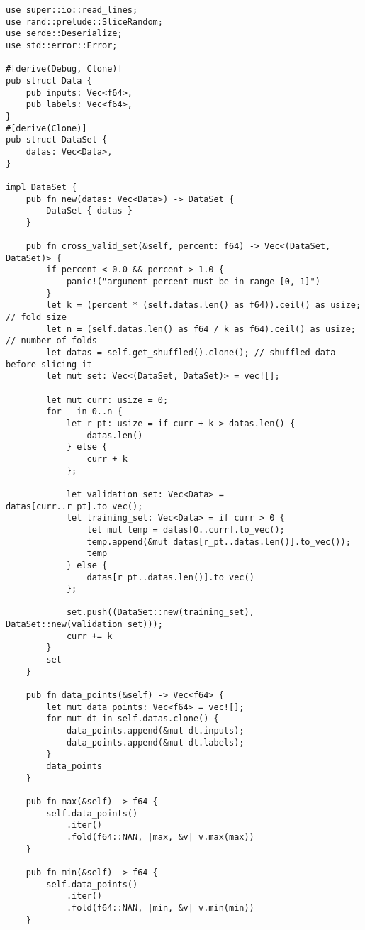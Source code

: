 \begin{verbatim}        
use super::io::read_lines;
use rand::prelude::SliceRandom;
use serde::Deserialize;
use std::error::Error;

#[derive(Debug, Clone)]
pub struct Data {
    pub inputs: Vec<f64>,
    pub labels: Vec<f64>,
}
#[derive(Clone)]
pub struct DataSet {
    datas: Vec<Data>,
}

impl DataSet {
    pub fn new(datas: Vec<Data>) -> DataSet {
        DataSet { datas }
    }

    pub fn cross_valid_set(&self, percent: f64) -> Vec<(DataSet, DataSet)> {
        if percent < 0.0 && percent > 1.0 {
            panic!("argument percent must be in range [0, 1]")
        }
        let k = (percent * (self.datas.len() as f64)).ceil() as usize; // fold size
        let n = (self.datas.len() as f64 / k as f64).ceil() as usize; // number of folds
        let datas = self.get_shuffled().clone(); // shuffled data before slicing it
        let mut set: Vec<(DataSet, DataSet)> = vec![];

        let mut curr: usize = 0;
        for _ in 0..n {
            let r_pt: usize = if curr + k > datas.len() {
                datas.len()
            } else {
                curr + k
            };

            let validation_set: Vec<Data> = datas[curr..r_pt].to_vec();
            let training_set: Vec<Data> = if curr > 0 {
                let mut temp = datas[0..curr].to_vec();
                temp.append(&mut datas[r_pt..datas.len()].to_vec());
                temp
            } else {
                datas[r_pt..datas.len()].to_vec()
            };

            set.push((DataSet::new(training_set), DataSet::new(validation_set)));
            curr += k
        }
        set
    }

    pub fn data_points(&self) -> Vec<f64> {
        let mut data_points: Vec<f64> = vec![];
        for mut dt in self.datas.clone() {
            data_points.append(&mut dt.inputs);
            data_points.append(&mut dt.labels);
        }
        data_points
    }

    pub fn max(&self) -> f64 {
        self.data_points()
            .iter()
            .fold(f64::NAN, |max, &v| v.max(max))
    }

    pub fn min(&self) -> f64 {
        self.data_points()
            .iter()
            .fold(f64::NAN, |min, &v| v.min(min))
    }


\end{verbatim}
